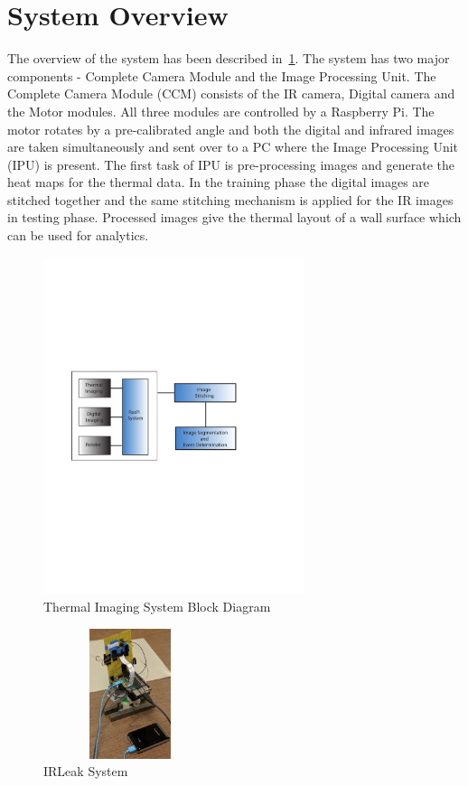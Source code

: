 \section{System Overview}

\indent The overview of the system has been described in~\ref{fig:Overview}. The system has two major components - Complete Camera Module and the Image Processing Unit. The Complete Camera Module (CCM) consists of the IR camera, Digital camera and the Motor modules. All three modules are controlled by a Raspberry Pi. The motor rotates by a pre-calibrated angle and both the digital and infrared images are taken simultaneously and sent over to a PC where the Image Processing Unit (IPU) is present. The first task of IPU is pre-processing images and generate the heat maps for the thermal data. In the training phase the digital images are stitched together and the same stitching mechanism is applied for the IR images in testing phase. Processed images give the thermal layout of a wall surface which can be used for analytics.


\begin{figure}[t!]
\begin{center}
	\includegraphics[width=3in]{figs/SystemArch.pdf}
\end{center}
  \caption{Thermal Imaging System Block Diagram}
  \label{fig:Overview}
\end{figure}

\begin{figure}[t!]
	\begin{center}
		\includegraphics[height=1.5in,width=2in]{figs/SystemDiagram}
	\end{center}
	\caption{IRLeak System}
	\label{fig:SystemDiagram}
\end{figure}